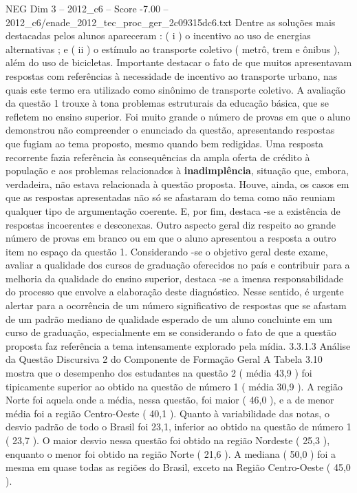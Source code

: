 \begin{textsample}{NEG Dim 3 – 2012\_c6 – Score -7.00 – 2012\_c6/enade\_2012\_tec\_proc\_ger\_2c09315dc6.txt}
Dentre as soluções mais destacadas pelos alunos apareceram : ( i ) o incentivo ao uso de energias alternativas ; e ( ii ) o estímulo ao transporte coletivo ( metrô, trem e ônibus ), além do uso de bicicletas.
Importante destacar o fato de que muitos apresentavam respostas com referências à necessidade de incentivo ao transporte urbano, nas quais este termo era utilizado como sinônimo de transporte coletivo.
A avaliação da questão 1 trouxe à tona problemas estruturais da educação básica, que se refletem no ensino superior.
Foi muito grande o número de provas em que o aluno demonstrou não compreender o enunciado da questão, apresentando respostas que fugiam ao tema proposto, mesmo quando bem redigidas.
Uma resposta recorrente fazia referência às consequências da ampla oferta de crédito à população e aos problemas relacionados à \textbf{inadimplência}, situação que, embora, verdadeira, não estava relacionada à questão proposta.
Houve, ainda, os casos em que as respostas apresentadas não só se afastaram do tema como não reuniam qualquer tipo de argumentação coerente.
E, por fim, destaca -se a existência de respostas incoerentes e desconexas.
Outro aspecto geral diz respeito ao grande número de provas em branco ou em que o aluno apresentou a resposta a outro item no espaço da questão 1.
Considerando -se o objetivo geral deste exame, avaliar a qualidade dos cursos de graduação oferecidos no país e contribuir para a melhoria da qualidade do ensino superior, destaca -se a imensa responsabilidade do processo que envolve a elaboração deste diagnóstico.
Nesse sentido, é urgente alertar para a ocorrência de um número significativo de respostas que se afastam de um padrão mediano de qualidade esperado de um aluno concluinte em um curso de graduação, especialmente em se considerando o fato de que a questão proposta faz referência a tema intensamente explorado pela mídia. 3.3.1.3 Análise da Questão Discursiva 2 do Componente de Formação Geral A Tabela 3.10 mostra que o desempenho dos estudantes na questão 2 ( média 43,9 ) foi tipicamente superior ao obtido na questão de número 1 ( média 30,9 ).
A região Norte foi aquela onde a média, nessa questão, foi maior ( 46,0 ), e a de menor média foi a região Centro-Oeste ( 40,1 ).
Quanto à variabilidade das notas, o desvio padrão de todo o Brasil foi 23,1, inferior ao obtido na questão de número 1 ( 23,7 ).
O maior desvio nessa questão foi obtido na região Nordeste ( 25,3 ), enquanto o menor foi obtido na região Norte ( 21,6 ).
A mediana ( 50,0 ) foi a mesma em quase todas as regiões do Brasil, exceto na Região Centro-Oeste ( 45,0 ).

\end{textsample}
